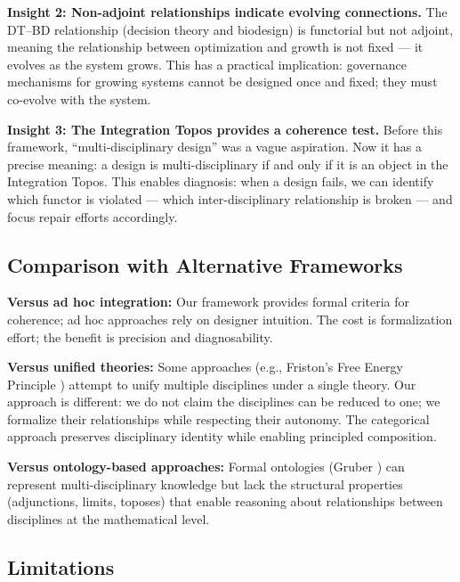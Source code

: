 \documentclass[11pt,a4paper]{article}
\begin{document}
\textbf{Insight 2: Non-adjoint relationships indicate evolving connections.} The DT--BD relationship (decision theory and biodesign) is functorial but not adjoint, meaning the relationship between optimization and growth is not fixed --- it evolves as the system grows. This has a practical implication: governance mechanisms for growing systems cannot be designed once and fixed; they must co-evolve with the system.

\textbf{Insight 3: The Integration Topos provides a coherence test.} Before this framework, ``multi-disciplinary design'' was a vague aspiration. Now it has a precise meaning: a design is multi-disciplinary if and only if it is an object in the Integration Topos. This enables diagnosis: when a design fails, we can identify which functor is violated --- which inter-disciplinary relationship is broken --- and focus repair efforts accordingly.

\subsection{Comparison with Alternative Frameworks}

\textbf{Versus ad hoc integration:} Our framework provides formal criteria for coherence; ad hoc approaches rely on designer intuition. The cost is formalization effort; the benefit is precision and diagnosability.

\textbf{Versus unified theories:} Some approaches (e.g., Friston's Free Energy Principle \cite{friston2010}) attempt to unify multiple disciplines under a single theory. Our approach is different: we do not claim the disciplines can be reduced to one; we formalize their relationships while respecting their autonomy. The categorical approach preserves disciplinary identity while enabling principled composition.

\textbf{Versus ontology-based approaches:} Formal ontologies (Gruber \cite{gruber1993}) can represent multi-disciplinary knowledge but lack the structural properties (adjunctions, limits, toposes) that enable reasoning about relationships between disciplines at the mathematical level.

\subsection{Limitations}
\end{document}
